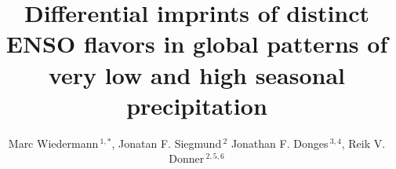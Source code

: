 \documentclass[utf8]{frontiersSCNS} %
\def\firstAuthorLast{Marc Wiedermann {et~al.}} %
\def\Authors{Marc Wiedermann\,$^{1,*}$, Jonatan F. Siegmund\,$^{2}$ Jonathan F. Donges\,$^{3,4}$, Reik V. Donner\,$^{2,5,6}$}
\begin{document}
\onecolumn
{}

\title[Differential imprints of ENSO flavors]{Differential imprints of distinct ENSO flavors in global patterns of very low and high seasonal precipitation} 

\author[\firstAuthorLast ]{\Authors} 
\address{} 
\correspondance{} 

\extraAuth{}%

\maketitle
\end{document}
